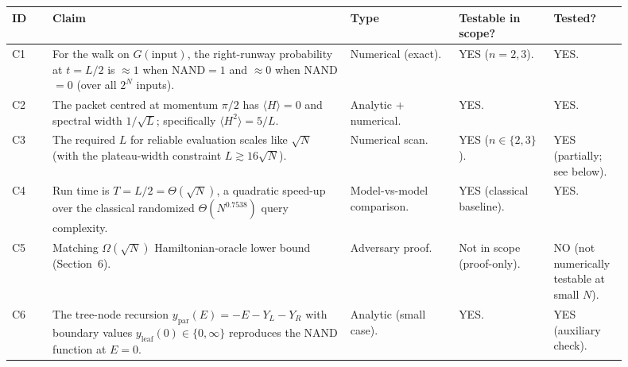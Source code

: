 \documentclass[11pt]{article}
\begin{document}
\begin{center}\small
\begin{tabular}{p{0.06\linewidth} p{0.44\linewidth} p{0.16\linewidth} p{0.14\linewidth} p{0.1\linewidth}}
\toprule
ID & Claim & Type & Testable in scope? & Tested? \\
\midrule
C1 & For the walk on $G(\text{input})$, the right-runway probability at $t=L/2$ is $\approx 1$ when NAND$=1$ and $\approx 0$ when NAND$=0$ (over all $2^N$ inputs). & Numerical (exact). & YES ($n{=}2,3$). & YES. \\
C2 & The packet centred at momentum $\pi/2$ has $\langle H\rangle=0$ and spectral width $1/\sqrt L$; specifically $\langle H^{2}\rangle = 5/L$. & Analytic + numerical. & YES. & YES. \\
C3 & The required $L$ for reliable evaluation scales like $\sqrt N$ (with the plateau-width constraint $L\gtrsim 16\sqrt N$). & Numerical scan. & YES ($n\in\{2,3\}$). & YES (partially; see below). \\
C4 & Run time is $T = L/2 = \Theta(\sqrt N)$, a quadratic speed-up over the classical randomized $\Theta(N^{0.7538})$ query complexity. & Model-vs-model comparison. & YES (classical baseline). & YES. \\
C5 & Matching $\Omega(\sqrt N)$ Hamiltonian-oracle lower bound (Section~6). & Adversary proof. & Not in scope (proof-only). & NO (not numerically testable at small $N$). \\
C6 & The tree-node recursion $y_{\text{par}}(E) = -E - Y_L - Y_R$ with boundary values $y_{\text{leaf}}(0)\in\{0,\infty\}$ reproduces the NAND function at $E=0$. & Analytic (small case). & YES. & YES (auxiliary check). \\
\bottomrule
\end{tabular}
\end{center}
\end{document}
